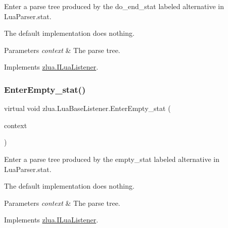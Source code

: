 Enter a parse tree produced by the {\ttfamily do\+\_\+end\+\_\+stat} labeled alternative in Lua\+Parser.\+stat. 

The default implementation does nothing.


\begin{DoxyParams}{Parameters}
{\em context} & The parse tree.\\
\hline
\end{DoxyParams}


Implements \mbox{\hyperlink{interfacezlua_1_1_i_lua_listener_ad561e0f5feb33ca80ba5202ab0511bab}{zlua.\+I\+Lua\+Listener}}.

\mbox{\label{classzlua_1_1_lua_base_listener_a5521468da5fe9ed0eb95ada9c64c801f}} 
\subsubsection{\texorpdfstring{Enter\+Empty\+\_\+stat()}{EnterEmpty\_stat()}}
{\footnotesize\ttfamily virtual void zlua.\+Lua\+Base\+Listener.\+Enter\+Empty\+\_\+stat (\begin{DoxyParamCaption}\item[{\mbox{[}\+Not\+Null\mbox{]} \mbox{\hyperlink{classzlua_1_1_lua_parser_1_1_empty__stat_context}{Lua\+Parser.\+Empty\+\_\+stat\+Context}}}]{context }\end{DoxyParamCaption})\hspace{0.3cm}{\ttfamily [virtual]}}



Enter a parse tree produced by the {\ttfamily empty\+\_\+stat} labeled alternative in Lua\+Parser.\+stat. 

The default implementation does nothing.


\begin{DoxyParams}{Parameters}
{\em context} & The parse tree.\\
\hline
\end{DoxyParams}


Implements \mbox{\hyperlink{interfacezlua_1_1_i_lua_listener_aaa6652e41dd59516afb02cde17c6a347}{zlua.\+I\+Lua\+Listener}}.

\mbox{\label{classzlua_1_1_lua_base_listener_aa20d29905862d24106bf15e909816993}} 
